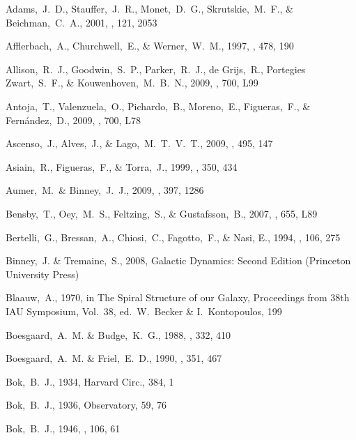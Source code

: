 \begin{thebibliography}{99}
  Adams,~J.~D., Stauffer,~J.~R., Monet,~D.~G., Skrutskie,~M.~F., \& Beichman,~C.~A., 2001,
  \aj, 121, 2053

  Afflerbach,~A., Churchwell,~E., \& Werner,~W.~M., 1997,
  \apj, 478, 190

  Allison,~R.~J., Goodwin,~S.~P., Parker,~R.~J., de Grijs,~R., Portegies Zwart,~S.~F., \& Kouwenhoven,~M.~B.~N., 2009,
  \apjl, 700, L99

  Antoja,~T., Valenzuela,~O., Pichardo,~B., Moreno,~E., Figueras,~F., \& Fern{\'a}ndez,~D., 2009,
  \apjl, 700, L78

  Ascenso,~J., Alves,~J., \& Lago,~M.~T.~V.~T., 2009,
  \aap, 495, 147

  Asiain,~R., Figueras,~F., \& Torra,~J., 1999,
  \aap, 350, 434

  Aumer,~M.~\& Binney,~J.~J., 2009,
  \mnras, 397, 1286

  Bensby,~T., Oey,~M.~S., Feltzing,~S., \& Gustafsson,~B., 2007,
  \apjl, 655, L89

  Bertelli,~G., Bressan,~A., Chiosi,~C., Fagotto,~F., \& Nasi, E., 1994,
  \aaps, 106, 275

  Binney,~J. \& Tremaine,~S., 2008, Galactic Dynamics: Second Edition
  (Princeton University Press)

  Blaauw,~A., 1970, in The Spiral Structure of our Galaxy, Proceedings from 38th IAU Symposium, Vol.~38, ed.~W.~Becker \& I.~Kontopoulos, 199

  Boesgaard,~A.~M. \& Budge,~K.~G., 1988,
  \apj, 332, 410

  Boesgaard,~A.~M. \& Friel,~E.~D., 1990,
  \apj, 351, 467

  Bok,~B.~J., 1934,
  Harvard Circ., 384, 1

  Bok,~B.~J., 1936,
  Observatory, 59, 76

  Bok,~B.~J., 1946,
  \mnras, 106, 61


\end{thebibliography}
